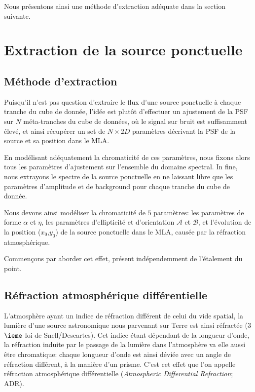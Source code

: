 \documentclass[../main/main.tex]{subfiles}
\begin{document}
Nous présentons ainsi une méthode d'extraction adéquate dans la section suivante. 


\section{Extraction de la source ponctuelle}

\subsection{Méthode d'extraction}\label{ssec:methodextraction}

Puisqu'il n'est pas question d'extraire le flux d'une source ponctuelle
à chaque tranche du cube de donnée, l'idée est plutôt d'effectuer un
ajustement de la PSF sur $N$ méta-tranches du cube de
données, où le signal sur bruit est suffisamment élevé, et ainsi récupérer
un set de $N\times2D$ paramètres décrivant la PSF de la source et sa position 
dans le MLA.

En modélisant adéquatement la chromaticité de ces paramètres, nous
fixons alors tous les paramètres d'ajustement sur l'ensemble du domaine
spectral. In fine, nous extrayons le spectre de la source
ponctuelle en ne laissant libre que les paramètres d'amplitude et de
background pour chaque tranche du cube de donnée.

Nous devons ainsi modéliser la chromaticité de $5$ paramètres: les
paramètres de forme $\alpha$ et $\eta$, les paramètres d'ellipticité et
d'orientation $\mathcal{A}$ et $\mathcal{B}$, et l'évolution de la
position ($x_{0}$,$y_{0}$) de la source ponctuelle dans le MLA, causée
par la réfraction atmosphérique.

Commençons par aborder cet effet, présent indépendemment de l'étalement
du point.


\subsection{R\'efraction atmosph\'erique
  diff\'erentielle}\label{ssec:adr}


L'atmosphère ayant un indice de réfraction différent de celui du vide
spatial, la lumière d'une source astronomique nous parvenant sur Terre
est ainsi réfractée (3$\ieme$ loi de Snell/Descartes). Cet indice étant dépendant de la longueur d'onde, la
réfraction induite par le passage de la lumière dans l'atmosphère va
elle aussi être chromatique: chaque longueur d'onde est ainsi déviée
avec un angle de réfraction différent, à la manière d'un prisme. C'est
cet effet que l'on appelle réfraction atmosphérique différentielle
(\textit{Atmospheric Differential Refraction}; ADR).
\end{document}
